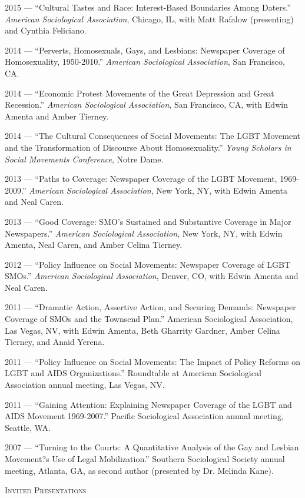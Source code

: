 \documentclass[11pt]{article}
\newcommand{\sectionheader}[1]{
{\Large
\textsc{#1}}
}
\begin{document}
2015 --- ``Cultural Tastes and Race: Interest-Based Boundaries Among Daters.'' \textit{American Sociological Association}, Chicago, IL, with Matt Rafalow (presenting) and Cynthia Feliciano.

2014 --- ``Perverts, Homosexuals, Gays, and Lesbians: Newspaper Coverage of Homosexuality, 1950-2010.'' \textit{American Sociological Association}, San Francisco, CA. 

2014 --- ``Economic Protest Movements of the Great Depression and Great Recession.'' \textit{American Sociological Association}, San Francisco, CA, with Edwin Amenta and Amber Tierney.

2014 --- ``The Cultural Consequences of Social Movements: The LGBT Movement and the Transformation of Discourse About Homosexuality.'' \textit{Young Scholars in Social Movements Conference}, Notre Dame.

2013 --- ``Paths to Coverage: Newspaper Coverage of the LGBT Movement, 1969-2009.'' \textit{American Sociological Association}, New York, NY, with Edwin Amenta and Neal Caren.

2013 --- ``Good Coverage: SMO's Sustained and Substantive Coverage in Major Newspapers.'' \textit{American Sociological Association}, New York, NY, with Edwin Amenta, Neal Caren, and Amber Celina Tierney.

2012 --- ``Policy Influence on Social Movements: Newspaper Coverage of LGBT SMOs.'' \textit{American Sociological Association}, Denver, CO, with Edwin Amenta and Neal Caren.

2011 --- ``Dramatic Action, Assertive Action, and Securing Demands: Newspaper Coverage of SMOs and the Townsend Plan.'' American Sociological Association, Las Vegas, NV, with Edwin Amenta, Beth Gharrity Gardner, Amber Celina Tierney, and Anaid Yerena.

2011 --- ``Policy Influence on Social Movements: The Impact of Policy Reforms on LGBT and AIDS Organizations.'' Roundtable at American Sociological Association annual meeting, Las Vegas, NV.

2011 --- ``Gaining Attention: Explaining Newspaper Coverage of the LGBT and AIDS Movement 1969-2007.'' Pacific Sociological Association annual meeting, Seattle, WA.

2007	 --- ``Turning to the Courts: A Quantitative Analysis of the Gay and Lesbian Movement?s Use of Legal Mobilization.'' Southern Sociological Society annual meeting, Atlanta, GA, as second author (presented by Dr. Melinda Kane).

\sectionheader{Invited Presentations}
\end{document}
